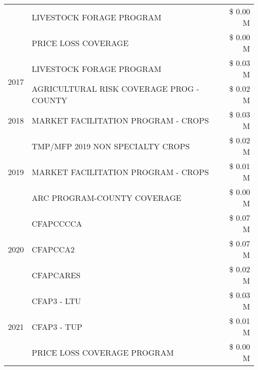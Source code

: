 \begin{tabular}{llr}
 & LIVESTOCK FORAGE PROGRAM & \$ 0.00 M \\
 & PRICE LOSS COVERAGE & \$ 0.00 M \\
\cline{1-3}
\multirow[t]{2}{*}{2017} & LIVESTOCK FORAGE PROGRAM & \$ 0.03 M \\
 & AGRICULTURAL RISK COVERAGE PROG - COUNTY & \$ 0.02 M \\
\cline{1-3}
2018 & MARKET FACILITATION PROGRAM - CROPS & \$ 0.03 M \\
\cline{1-3}
\multirow[t]{3}{*}{2019} & TMP/MFP 2019 NON SPECIALTY CROPS & \$ 0.02 M \\
 & MARKET FACILITATION PROGRAM - CROPS & \$ 0.01 M \\
 & ARC PROGRAM-COUNTY COVERAGE & \$ 0.00 M \\
\cline{1-3}
\multirow[t]{3}{*}{2020} & CFAPCCCCA & \$ 0.07 M \\
 & CFAPCCA2 & \$ 0.07 M \\
 & CFAPCARES & \$ 0.02 M \\
\cline{1-3}
\multirow[t]{3}{*}{2021} & CFAP3 - LTU & \$ 0.03 M \\
 & CFAP3 - TUP & \$ 0.01 M \\
 & PRICE LOSS COVERAGE PROGRAM & \$ 0.00 M \\
\cline{1-3}
\bottomrule
\end{tabular}
